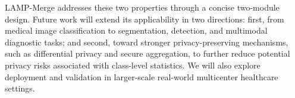 \documentclass[letterpaper]{article} %
\begin{document}
LAMP-Merge addresses these two properties through a concise two-module design. Future work will extend its applicability in two directions: first, from medical image classification to segmentation, detection, and multimodal diagnostic tasks; and second, toward stronger privacy-preserving mechanisms, such as differential privacy and secure aggregation, to further reduce potential privacy risks associated with class-level statistics\cite{kaissis2020secure,geyer2017differentially,abadi2016deep}. We will also explore deployment and validation in larger-scale real-world multicenter healthcare settings.



\end{document}
